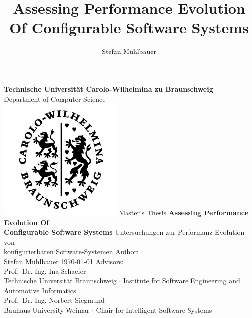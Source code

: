 \documentclass[
	12pt,
	a4paper,
	oneside,
	openright,
	listof=totoc%
]{scrbook}
\title{Assessing Performance Evolution Of Configurable Software Systems}
\author{Stefan Mühlbauer}
\begin{document}
\newtheorem{definition}{Def.~}[section]

\begin{titlepage}
    \centering
    {
    	\textbf{Technische Universität Carolo-Wilhelmina zu Braunschweig}\\ 
    		\vspace{2mm}
    	Department of Computer Science
    }
    \vspace{1.5cm}\\
    \includegraphics[width=6cm]{images/SiegelTU.png}%
    \vfill
    Master's Thesis
    \vfill
    {\bfseries\LARGE\linespread{2.0}
        Assessing Performance Evolution Of\\
        	\vspace{3mm}
         Configurable Software Systems
    }  
    \vfill
    {Untersuchungen zur Performanz-Evolution von \\
    konfigurierbaren Software-Systemen}
    \vfill
    {
    	Author:\\
    	\vspace{3mm}
    	{\Large Stefan Mühlbauer}
    }
    \vfill
    \today
    \vfill
    Advisors:\\
    \vspace{3mm}
    {\large Prof.~Dr.-Ing. Ina Schaefer}\\
    \vspace{1mm}
    {Technische Universität Braunschweig $\cdot$ Institute for Software
    Engineering and Automotive Informatics}\\
    \vspace{3mm}
    {\large Prof.~Dr.-Ing. Norbert Siegmund}\\
    \vspace{1mm}
    {Bauhaus University Weimar $\cdot$ Chair for Intelligent Software Systems}
\end{titlepage}
\end{document}
